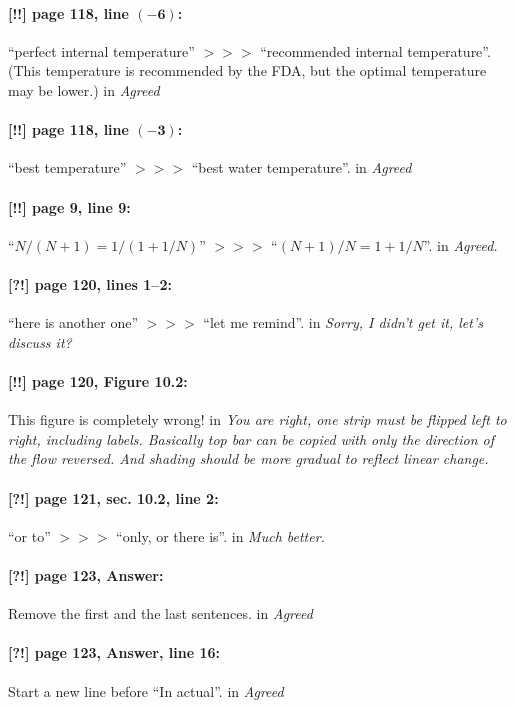 \documentclass[twoside]{article}
\begin{document}
\paragraph{[!!] page 118, line $\bm{(-6)}$:} ``perfect internal temperature'' $>\!>\!>$ ``recommended internal temperature''. (This temperature is recommended by the FDA, but the optimal temperature may be lower.)
 in {\it  Agreed} 

\paragraph{[!!] page 118, line $\bm{(-3)}$:} ``best temperature'' $>\!>\!>$ ``best water temperature''.
 in {\it  Agreed} 

\paragraph{[!!] page 9, line 9:} ``$N/(N+1)=1/(1+1/N)$'' $>\!>\!>$ ``$(N+1)/N = 1 + 1/N$''.
 in {\it Agreed.}

\paragraph{[?!] page 120, lines 1--2:} ``here is another one'' $>\!>\!>$ ``let me remind''.
 in {\it  Sorry, I didn't get it, let's discuss it? } 

\paragraph{[!!] page 120, Figure 10.2:} This figure is completely wrong!
 in {\it  You are right, one strip must be flipped left to right, including labels. Basically top bar can be copied with only the direction of the flow reversed. And shading should be more gradual to reflect linear change.} 


\paragraph{[?!] page 121, sec. 10.2, line 2:} ``or to'' $>\!>\!>$ ``only, or there is''.
 in {\it  Much better.} 

\paragraph{[?!] page 123, Answer:} Remove the first and the last sentences.
 in {\it  Agreed} 

\paragraph{[?!] page 123, Answer, line 16:} Start a new line before ``In actual''.
 in {\it  Agreed} 
\end{document}
